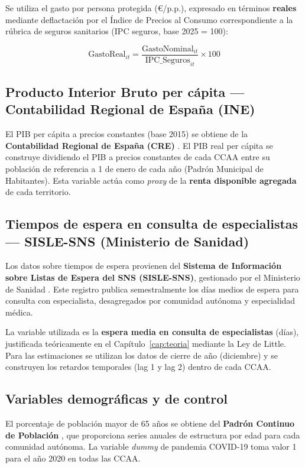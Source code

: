 Se utiliza el gasto por persona protegida (€/p.p.), expresado en términos
\textbf{reales} mediante deflactación por el Índice de Precios al Consumo
correspondiente a la rúbrica de seguros sanitarios (IPC seguros, base 2025 = 100):

\begin{equation}
  \text{GastoReal}_{it} =
  \frac{\text{GastoNominal}_{it}}{\text{IPC\_Seguros}_{it}} \times 100
  \label{eq:deflactacion}
\end{equation}

\subsection{Producto Interior Bruto per cápita --- Contabilidad Regional de España
(INE)}

El PIB per cápita a precios constantes (base 2015) se obtiene de la
\textbf{Contabilidad Regional de España (CRE)} \parencite{INE_CRE}. El PIB real
per cápita se construye dividiendo el PIB a precios constantes de cada CCAA entre
su población de referencia a 1 de enero de cada año (Padrón Municipal de
Habitantes). Esta variable actúa como \textit{proxy} de la \textbf{renta
disponible agregada} de cada territorio.

\subsection{Tiempos de espera en consulta de especialistas --- SISLE-SNS
(Ministerio de Sanidad)}

Los datos sobre tiempos de espera provienen del \textbf{Sistema de Información
sobre Listas de Espera del SNS (SISLE-SNS)}, gestionado por el Ministerio de
Sanidad \parencite{MinSanidad}. Este registro publica semestralmente los días
medios de espera para consulta con especialista, desagregados por comunidad
autónoma y especialidad médica.

La variable utilizada es la \textbf{espera media en consulta de especialistas}
(días), justificada teóricamente en el Capítulo~\ref{cap:teoria} mediante la Ley
de Little. Para las estimaciones se utilizan los datos de cierre de año
(diciembre) y se construyen los retardos temporales (lag 1 y lag 2) dentro de
cada CCAA.

\subsection{Variables demográficas y de control}

El porcentaje de población mayor de 65 años se obtiene del \textbf{Padrón
Continuo de Población} \parencite{INE_CRE}, que proporciona series anuales de
estructura por edad para cada comunidad autónoma. La variable \textit{dummy} de
pandemia COVID-19 toma valor 1 para el año 2020 en todas las CCAA.

